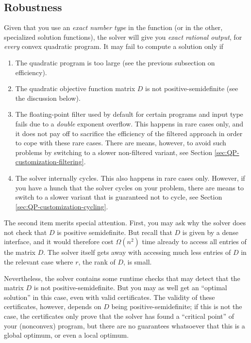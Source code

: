 \subsection{Robustness\label{sec:QP-robustness}}
Given that you use an \emph{exact number type} in the function
 (or in the other, specialized 
solution functions),  the solver
will give you \emph{exact rational output}, for \emph{every}
convex quadratic program. It may fail to compute a solution only if
\begin{enumerate}
\item The quadratic program is too large (see the previous subsection 
on efficiency).
\item The quadratic objective function matrix $D$ is not 
positive-semidefinite (see the discussion below).
\item The floating-point filter used by default for certain programs
  and input type  fails due to a \emph{double} exponent
  overflow. This happens in rare cases only, and it does not pay off
  to sacrifice the efficiency of the filtered approach in order to
  cope with these rare cases. There are means, however, to avoid such
  problems by switching to a slower non-filtered variant, see Section
  \ref{sec:QP-customization-filtering}.
\item The solver internally cycles. This also happens in rare
cases only. However, if
you have a hunch that the solver cycles on your problem,
there are means to switch to a slower variant that is guaranteed
not to cycle, see Section \ref{sec:QP-customization-cycling}.
\end{enumerate}

The second item merits special attention. First, you may ask why the
solver does not check that $D$ is positive semidefinite. But recall
that $D$ is given by a dense interface, and it would therefore cost
$\Omega(n^2)$ time already to access all entries of the matrix $D$.
The solver itself gets away with accessing much less entries of 
$D$ in the relevant case where $r$, the rank of $D$, is small.

Nevertheless, the solver contains some runtime checks
that may detect that the matrix $D$ is not positive-semidefinite. But
you may as well get an ``optimal solution'' in this case, even with
valid certificates. The validity of these certificates, however, 
depends on $D$ being positive-semidefinite; if this is not the case, the
certificates only prove that the solver has found a ``critical point'' of
your (nonconvex) program, but there are no guarantees whatsoever that
this is a global optimum, or even a local optimum.


